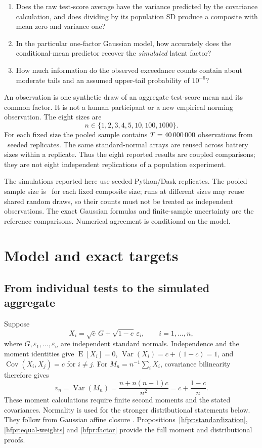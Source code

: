 \begin{enumerate}
\item Does the raw test-score average have the variance predicted by the
covariance calculation, and does dividing by its population SD produce a
composite with mean zero and variance one?
\item In the particular one-factor Gaussian model, how accurately does the
conditional-mean predictor recover the \emph{simulated} latent factor?
\item How much information do the observed exceedance counts contain about
moderate tails and an assumed upper-tail probability of \(10^{-6}\)?
\end{enumerate}

An observation is one synthetic draw of an aggregate test-score mean and its
common factor. It is not a human participant or a new empirical norming
observation. The eight sizes are
\[n\in\{1,2,3,4,5,10,100,1000\}.\]
For each fixed size the pooled sample contains
\(T=40\,000\,000\) observations from \SimReplicates\ seeded replicates.
The same standard-normal arrays are reused across battery sizes within a
replicate. Thus the eight reported results are coupled comparisons; they
are not eight independent replications of a population experiment.

The simulations reported here use \SimReplicates{} seeded Python/Dask replicates.
The pooled sample size is \SimPooledTrials\ for each fixed composite
size; runs at different sizes may reuse shared random draws, so their
counts must not be treated as independent observations.
The exact Gaussian formulas and finite-sample uncertainty are the
reference comparisons. Numerical agreement is conditional on the model.

\chapter{Model and exact targets}
\section{From individual tests to the simulated aggregate}
Suppose
\begin{equation}
 X_i=\sqrt c\,G+\sqrt{1-c}\,\varepsilon_i,
 \qquad i=1,\ldots,n,
 \label{eq:hf-factor-model}
\end{equation}
where \(G,\varepsilon_1,\ldots,\varepsilon_n\) are independent standard
normals. Independence and the moment identities give
\(\operatorname E[X_i]=0\),
\(\operatorname{Var}(X_i)=c+(1-c)=1\), and
\(\operatorname{Cov}(X_i,X_j)=c\) for \(i\ne j\).
For \(M_n=n^{-1}\sum_iX_i\), covariance bilinearity therefore gives
\begin{equation}
 v_n=\operatorname{Var}(M_n)
 =\frac{n+n(n-1)c}{n^2}
 =c+\frac{1-c}{n}.
 \label{eq:hf-average-variance}
\end{equation}
These moment calculations require finite second moments and the stated
covariances. Normality is used for the stronger distributional statements
below. They follow from Gaussian affine closure
\citep[Definition 3.3.1 and Theorem 3.3.1]{gallager2013}.
Propositions~\ref{hfpr:standardization}, \ref{hfpr:equal-weights} and
\ref{hfpr:factor} provide the full moment and distributional proofs.

